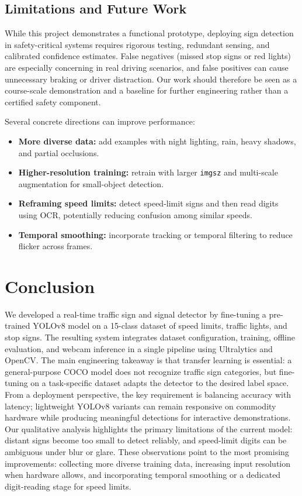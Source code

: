 \documentclass[conference]{IEEEtran}
\begin{document}
\subsection{Limitations and Future Work}
While this project demonstrates a functional prototype, deploying sign detection in safety-critical systems requires rigorous testing, redundant sensing, and calibrated confidence estimates. False negatives (missed stop signs or red lights) are especially concerning in real driving scenarios, and false positives can cause unnecessary braking or driver distraction. Our work should therefore be seen as a course-scale demonstration and a baseline for further engineering rather than a certified safety component.

Several concrete directions can improve performance:
\begin{itemize}
    \item \textbf{More diverse data:} add examples with night lighting, rain, heavy shadows, and partial occlusions.
    \item \textbf{Higher-resolution training:} retrain with larger \texttt{imgsz} and multi-scale augmentation for small-object detection.
    \item \textbf{Reframing speed limits:} detect speed-limit signs and then read digits using OCR, potentially reducing confusion among similar speeds.
    \item \textbf{Temporal smoothing:} incorporate tracking or temporal filtering to reduce flicker across frames.
\end{itemize}

\section{Conclusion}
We developed a real-time traffic sign and signal detector by fine-tuning a pre-trained YOLOv8 model on a 15-class dataset of speed limits, traffic lights, and stop signs. The resulting system integrates dataset configuration, training, offline evaluation, and webcam inference in a single pipeline using Ultralytics and OpenCV. The main engineering takeaway is that transfer learning is essential: a general-purpose COCO model does not recognize traffic sign categories, but fine-tuning on a task-specific dataset adapts the detector to the desired label space. From a deployment perspective, the key requirement is balancing accuracy with latency; lightweight YOLOv8 variants can remain responsive on commodity hardware while producing meaningful detections for interactive demonstrations. Our qualitative analysis highlights the primary limitations of the current model: distant signs become too small to detect reliably, and speed-limit digits can be ambiguous under blur or glare. These observations point to the most promising improvements: collecting more diverse training data, increasing input resolution when hardware allows, and incorporating temporal smoothing or a dedicated digit-reading stage for speed limits.
\end{document}
